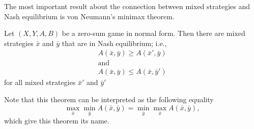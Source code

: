 The most important result about the connection between mixed strategies and Nash
equilibrium is von Neumann's minimax theorem.
\begin{theorem}
  Let $(X, Y, A, B)$ be a zero-sum game in normal form. Then there are mixed
  strategies $\bar{x}$ and $\bar{y}$ that are in Nash equilibrium; i.e., 
  \begin{gather*}
    A(\bar{x}, \bar{y}) \ge A(\bar{x}', \bar{y}) \\
    \text{and} \\
    A(\bar{x}, \bar{y}) \le A(\bar{x}, \bar{y}')
  \end{gather*}
  for all mixed strategies $\bar{x}'$ and $\bar{y}'$
\end{theorem}
Note that this theorem can be interpreted as the following equality 
\[
  \max_{\bar{x}} \min_{\bar{y}} A(\bar{x}, \bar{y}) = 
  \min_{\bar{y}} \max_{\bar{x}} A(\bar{x}, \bar{y}),
\]
which give this theorem its name.
